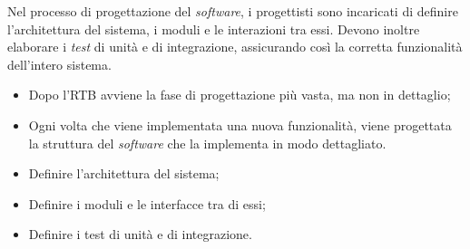 \label{progettazione}
Nel processo di progettazione del \textit{software}, i progettisti sono incaricati di definire l'architettura del sistema, i moduli e le interazioni tra essi. 
Devono inoltre elaborare i \textit{test} di unità e di integrazione, assicurando così la corretta funzionalità dell'intero sistema.


\begin{itemize}
	\item Dopo l'RTB avviene la fase di progettazione più vasta, ma non in
	      dettaglio;

	\item Ogni volta che viene implementata una nuova funzionalità, viene
	      progettata la struttura del \textit{software} che la implementa in
	      modo dettagliato.
\end{itemize}

\begin{itemize}
	\item Definire l'architettura del sistema;
	\item Definire i moduli e le interfacce tra di essi;
	\item Definire i test di unità e di integrazione.
\end{itemize}

